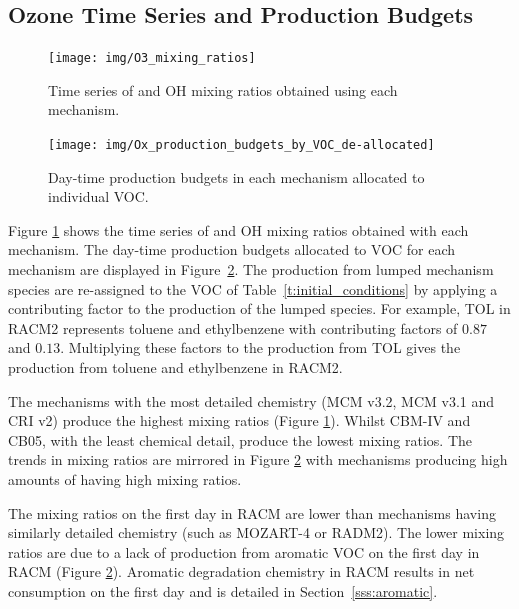 
\subsection[Ozone Time Series and Ox Production Budgets]{Ozone Time Series and  Production Budgets} \label{ss:O3_time_series}

\begin{figure}
    \centering
    \texttt{[image: img/O3\_mixing\_ratios]}
    \vspace{1mm}
    \caption{Time series of  and OH mixing ratios obtained using each mechanism.}
    \vspace{-4mm}
    \label{f:time_series}
\end{figure}

\begin{figure}
    \centering
    \texttt{[image: img/Ox\_production\_budgets\_by\_VOC\_de-allocated]}
    \vspace{1mm}
    \caption{Day-time  production budgets in each mechanism allocated to individual VOC.}
    \vspace{-4mm}
    \label{f:Ox_tagged_budgets}
\end{figure}

Figure \ref{f:time_series} shows the time series of  and OH mixing ratios obtained with each mechanism.
The day-time  production budgets allocated to VOC for each mechanism are displayed in \mbox{Figure \ref{f:Ox_tagged_budgets}}.
The  production from lumped mechanism species are re-assigned to the VOC of \mbox{Table \ref{t:initial_conditions}} by applying a contributing factor to the  production of the lumped species.
For example, TOL in RACM2 represents toluene and ethylbenzene with contributing factors of $0.87$ and $0.13$.
Multiplying these factors to the  production from TOL gives the  production from toluene and ethylbenzene in RACM2.

The mechanisms with the most detailed chemistry (MCM v3.2, MCM v3.1 and CRI v2) produce the highest  mixing ratios (Figure \ref{f:time_series}).
Whilst CBM-IV and CB05, with the least chemical detail, produce the lowest  mixing ratios.
The trends in  mixing ratios are mirrored in Figure \ref{f:Ox_tagged_budgets} with mechanisms producing high amounts of  having high  mixing ratios.

The  mixing ratios on the first day in RACM are lower than mechanisms having similarly detailed chemistry (such as MOZART-4 or RADM2).
The lower  mixing ratios are due to a lack of  production from aromatic VOC on the first day in RACM (Figure \ref{f:Ox_tagged_budgets}).
Aromatic degradation chemistry in RACM results in net  consumption on the first day and is detailed in \mbox{Section \ref{sss:aromatic}}.


